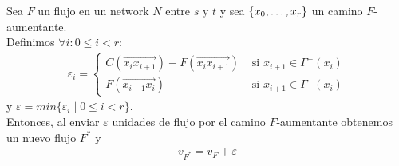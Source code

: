 \begin{lemma}\label{flujo_camino_aumentante}
Sea $F$ un flujo en un network $N$ entre $s$ y $t$ y sea $\{x_0,\mathellipsis,x_r\}$ un camino $F$-aumentante.\\
Definimos $\forall i: 0\le i < r:$  \begin{align}
    \varepsilon_i = \left\{
    \begin{array}{cc}
         C(\overrightarrow{x_i x_{i+1}}) - F(\overrightarrow{x_i x_{i+1}}) &\text{ si } x_{i+1} \in \Gamma^{+}(x_i)\\
         F(\overrightarrow{x_{i+1} x_i}) &\text{ si } x_{i+1} \in \Gamma^{-} (x_i)
    \end{array}
    \right.
\end{align}
y $\varepsilon = min\{\varepsilon_i\mid 0\le i < r \}$.\\

Entonces, al enviar $\varepsilon$ unidades de flujo por el camino $F$-aumentante obtenemos un nuevo flujo $F^{*}$ y \begin{align}
    v_{F^{*}} = v_F + \varepsilon
\end{align}
\end{lemma}

